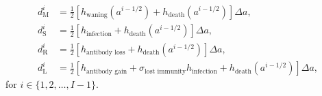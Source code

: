\documentclass[12pt]{article}
\begin{document}
\begin{subequations}
  \begin{align}
    d_{\mathrm{M}}^i
    &= \frac{1}{2} \left[h_{\text{waning}}(a^{i - 1 / 2})
      + h_{\text{death}}(a^{i - 1 / 2})\right]
      \Delta a,
    \\
    d_{\mathrm{S}}^i
    &= \frac{1}{2} \left[h_{\text{infection}}
      + h_{\text{death}}(a^{i - 1 / 2})\right]
      \Delta a,
    \\
    d_{\mathrm{R}}^i
    &= \frac{1}{2} \left[h_{\text{antibody loss}}
      + h_{\text{death}}(a^{i - 1 / 2})\right]
      \Delta a,
    \\
    d_{\mathrm{L}}^i
    &= \frac{1}{2} \left[h_{\text{antibody gain}}
      + \sigma_{\text{lost immunity}} h_{\text{infection}}
      + h_{\text{death}}(a^{i - 1 / 2})\right]
      \Delta a,
  \end{align}
\end{subequations}
for $i \in \{1, 2, \ldots, I - 1\}$.
\end{document}
